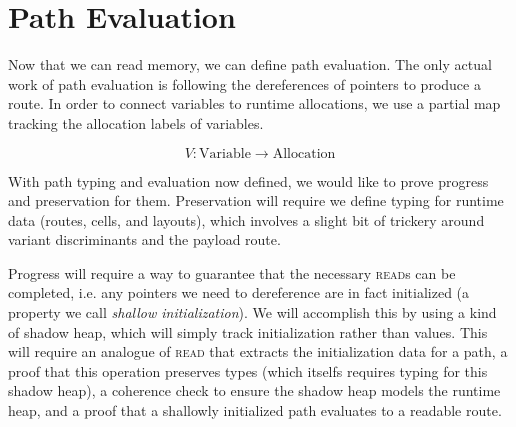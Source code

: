 \section*{Path Evaluation}

Now that we can read memory, we can define path evaluation.
The only actual work of path evaluation is following the dereferences of pointers
to produce a route. In order to connect variables to runtime allocations, we use
a partial map tracking the allocation labels of variables.

$$ V : \mathrm{Variable} \to \mathrm{Allocation} $$



With path typing and evaluation now defined, we would like to prove progress
and preservation for them. Preservation will require we define typing for
runtime data (routes, cells, and layouts), which involves a slight bit of trickery
around variant discriminants and the payload route.

Progress will require a way to guarantee that the necessary \textsc{read}s 
can be completed, i.e. any pointers we need to dereference are in fact initialized
(a property we call \emph{shallow initialization}).
We will accomplish this by using a kind of shadow heap, which will simply track
initialization rather than values.
This will require an analogue of \textsc{read} that extracts the initialization
data for a path, a proof that this operation preserves types 
(which itselfs requires typing for this shadow heap),
a coherence check to ensure the shadow heap models the runtime heap,
and a proof that a shallowly initialized path evaluates to a readable route.

